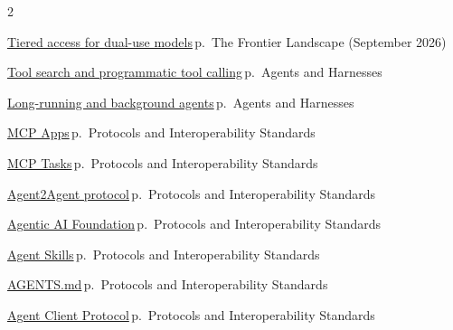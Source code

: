 \documentclass[10pt,a4paper,openany]{report}
\begin{document}
\begin{multicols}{2}\small\raggedright
\hyperref[c:landscape-2]{Tiered access for dual-use models}\,{\color{muted}\scriptsize p.\,\pageref{c:landscape-2}} {\color{muted}\scriptsize The Frontier Landscape (September 2026)}\par\vspace{2pt}
\hyperref[c:agents-6]{Tool search and programmatic tool calling}\,{\color{muted}\scriptsize p.\,\pageref{c:agents-6}} {\color{muted}\scriptsize Agents and Harnesses}\par\vspace{2pt}
\hyperref[c:agents-8]{Long-running and background agents}\,{\color{muted}\scriptsize p.\,\pageref{c:agents-8}} {\color{muted}\scriptsize Agents and Harnesses}\par\vspace{2pt}
\hyperref[c:protocols-1]{MCP Apps}\,{\color{muted}\scriptsize p.\,\pageref{c:protocols-1}} {\color{muted}\scriptsize Protocols and Interoperability Standards}\par\vspace{2pt}
\hyperref[c:protocols-2]{MCP Tasks}\,{\color{muted}\scriptsize p.\,\pageref{c:protocols-2}} {\color{muted}\scriptsize Protocols and Interoperability Standards}\par\vspace{2pt}
\hyperref[c:protocols-3]{Agent2Agent protocol}\,{\color{muted}\scriptsize p.\,\pageref{c:protocols-3}} {\color{muted}\scriptsize Protocols and Interoperability Standards}\par\vspace{2pt}
\hyperref[c:protocols-4]{Agentic AI Foundation}\,{\color{muted}\scriptsize p.\,\pageref{c:protocols-4}} {\color{muted}\scriptsize Protocols and Interoperability Standards}\par\vspace{2pt}
\hyperref[c:protocols-5]{Agent Skills}\,{\color{muted}\scriptsize p.\,\pageref{c:protocols-5}} {\color{muted}\scriptsize Protocols and Interoperability Standards}\par\vspace{2pt}
\hyperref[c:protocols-6]{AGENTS.md}\,{\color{muted}\scriptsize p.\,\pageref{c:protocols-6}} {\color{muted}\scriptsize Protocols and Interoperability Standards}\par\vspace{2pt}
\hyperref[c:protocols-7]{Agent Client Protocol}\,{\color{muted}\scriptsize p.\,\pageref{c:protocols-7}} {\color{muted}\scriptsize Protocols and Interoperability Standards}\par\vspace{2pt}

\end{multicols}
\end{document}
